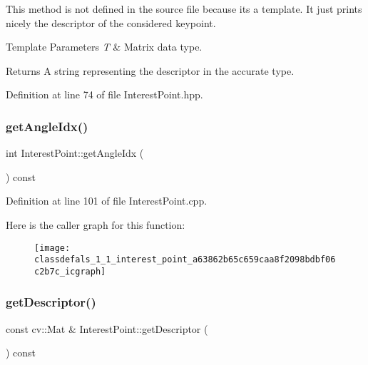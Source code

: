This method is not defined in the source file because it\textquotesingle{}s a template. It just prints nicely the descriptor of the considered keypoint.


\begin{DoxyTemplParams}{Template Parameters}
{\em T} & Matrix data type.\\
\hline
\end{DoxyTemplParams}
\begin{DoxyReturn}{Returns}
A string representing the descriptor in the accurate type. 
\end{DoxyReturn}


Definition at line 74 of file Interest\+Point.\+hpp.

\mbox{\label{classdefals_1_1_interest_point_a63862b65c659caa8f2098bdbf06c2b7c}} 
\subsubsection{\texorpdfstring{get\+Angle\+Idx()}{getAngleIdx()}}
{\footnotesize\ttfamily int Interest\+Point\+::get\+Angle\+Idx (\begin{DoxyParamCaption}{ }\end{DoxyParamCaption}) const}



Definition at line 101 of file Interest\+Point.\+cpp.

Here is the caller graph for this function\+:\nopagebreak
\begin{figure}[H]
\begin{center}
\leavevmode
\texttt{[image: classdefals\_1\_1\_interest\_point\_a63862b65c659caa8f2098bdbf06c2b7c\_icgraph]}
\end{center}
\end{figure}
\mbox{\label{classdefals_1_1_interest_point_a1defbefa0bceea4052200c4348e4ef52}} 
\subsubsection{\texorpdfstring{get\+Descriptor()}{getDescriptor()}}
{\footnotesize\ttfamily const cv\+::\+Mat \& Interest\+Point\+::get\+Descriptor (\begin{DoxyParamCaption}{ }\end{DoxyParamCaption}) const}

